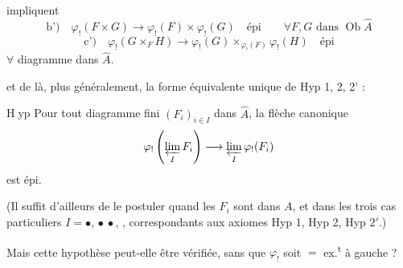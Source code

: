 
impliquent
\[
\text{b')}\quad\varphi_!(F\times G)\longrightarrow\varphi_!(F)\times\varphi_!(G)\quad\text{épi}
\qquad\forall F,G\text{ dans }\operatorname{Ob}\widehat A
\]
\[
\text{c')}\quad\varphi_!(G\times_F H)\longrightarrow
\varphi_!(G)\times_{\varphi_!(F)}\varphi_!(H)\quad\text{épi}
\]
$\forall$ diagramme
dans $\widehat A$.

et de là, plus généralement, la forme équivalente unique de Hyp 1, 2, 2' :

\textcircled{Hyp}
Pour tout diagramme fini $(F_i)_{i\in I}$ dans $\widehat A$, la flèche canonique
\[
\varphi_!\left(\varprojlim_I F_i\right)\longrightarrow\varprojlim_I\varphi_!(F_i)
\]
est épi.

(Il suffit d'ailleurs de le postuler quand les $F_i$ sont dans $A$, et dans les trois cas particuliers $I=\bullet$, $\bullet\ \bullet$,
\diagram{\begin{tikzcd}[ampersand replacement=\&,column sep=tiny,row sep=tiny]
\bullet\arrow[dr]\&\&\bullet\arrow[dl]\\
\&\bullet\&
\end{tikzcd}}, correspondants aux axiomes Hyp 1, Hyp 2, Hyp $2'$.)

Mais cette hypothèse peut-elle être vérifiée, sans que $\varphi_!$ soit $=$ ex.\textsuperscript{t} à gauche ?

